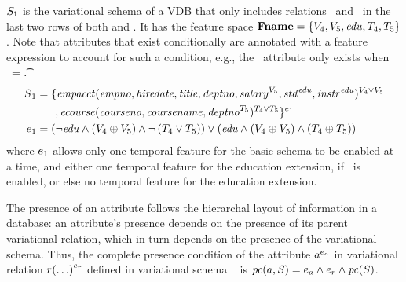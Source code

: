 \begin{example}
\label{eg:vsch}
$\vSch_1$ is the variational schema of a VDB that only includes relations \empacct\ and \ecourse\ in the last two rows
of both  and . It has the
feature space 
\ensuremath{\fSet = \setDef{ \vFour, \vFive, \edu, \tFour, \tFive}}.
Note that attributes that exist conditionally are annotated with a feature expression
to account for such a condition, e.g., the \salary\ attribute only exists when \vFive\ = \t.
%
\begin{align*}
\vSch_1 &=
\{ \empacct ( \empno, \hiredate, \titleatt, \deptno, \annot [\vFive] \salary, 
 \annot [\edu] \isstudent,
\annot [\edu] \isteacher )^{\vFour \vee \vFive}\\
%
&\hspace{17pt}, \ecourse ( \cno, \cname, \annot [\tFive] \deptno )^{\tFour \vee \tFive} \}^{\dimMeta_1}\\
\dimMeta_1 &= 
\paran {\neg \edu \wedge \paran {\vFour \oplus \vFive} \wedge \neg \paran {\tFour \vee \tFive}
 }
\vee
\paran {\edu \wedge \paran {\vFour \oplus \vFive}
\wedge
\paran {\tFour \oplus \tFive}}
\end{align*}
where \ensuremath{\dimMeta_1} allows only one temporal feature for the basic
schema to be enabled at a time, and either one temporal feature for the education
extension, if \edu\ is enabled, or else no temporal feature for the education
extension.
\end{example}



The presence of an attribute follows the hierarchal layout of information in a database:
an attribute's presence depends on the presence of its parent variational relation, which in turn 
depends on the presence of the variational schema. 
%
Thus, the complete presence condition of the attribute
$\annot[\dimMeta_\vAtt]{\vAtt}$ in variational relation
$\vRel\annot[\dimMeta_\vRel]{(\ldots)}$ defined in variational schema \vSch\
is
$\getPCfrom{\vAtt}{\vSch}=\dimMeta_\vAtt\wedge\dimMeta_\vRel\wedge \getPC \vSch$.

